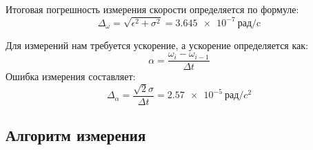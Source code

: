 Итоговая погрешность измерения скорости определяется по формуле:
\begin{equation}
	\Delta_{\omega}=\sqrt{\epsilon^2+\sigma^2}=\SI{3,645 e-7}{\text{рад/c}}
	\label{eq:rmse}
\end{equation}

Для измерений нам требуется ускорение, а ускорение определяется как:
\begin{equation}
	\alpha =\frac{\omega_i-\omega_{i-1}}{\Delta t}
	\label{eq:acc}
\end{equation}
Ошибка измерения составляет:
\begin{equation}
	\Delta_\alpha = \frac{\sqrt{2}\sigma}{\Delta t} = \SI{2,57 e-5}{\text{рад}/c^2}
	\label{eq:rmse_a}
\end{equation}






\subsection{Алгоритм измерения}

 
 
 
 





